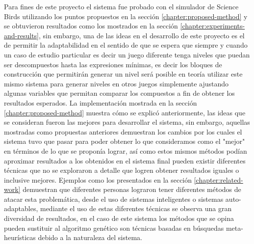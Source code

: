 Para fines de este proyecto el sistema fue probado con el simulador de Science
Birds utilizando los puntos propuestos en la sección
\ref{chapter:proposed-method} y se obtuvieron resultados como los mostrados en
la sección \ref{chapter:experiments-and-results}, sin embargo, una de las ideas
en el desarrollo de este proyecto es el de permitir la adaptabilidad
 en el
sentido de que se espera que siempre y cuando un caso de estudio particular es
decir un juego diferente tenga niveles que puedan ser descompuestos hasta las
expresiones mínimas, es decir los bloques de construcción que permitirán generar
un nivel será posible en teoría utilizar este mismo sistema para generar niveles
en otros juegos simplemente ajustando algunas variables que permitan comparar
los compuestos a fin de obtener los resultados esperados.
La implementación mostrada en la sección \ref{chapter:proposed-method} muestra
cómo se explicó anteriormente, las ideas que se consideran fueron las mejores
para desarrollar el sistema, sin embargo, aquellas mostradas como propuestas
anteriores demuestran los cambios por los cuales el sistema tuvo que pasar para
poder obtener lo que consideramos como el "mejor" en términos de lo que se
proponía lograr, así como estos mismos métodos podían aproximar resultados a los
obtenidos en el sistema final pueden existir diferentes técnicas que no se
exploraron a detalle que logren obtener resultados iguales o inclusive mejores.
Ejemplos como los presentados en la sección \ref{chapter:related-work}
demuestran que diferentes personas lograron tener diferentes métodos de atacar
esta problemática, desde el uso de sistemas inteligentes o sistemas
auto-adaptables, mediante el uso de estas diferentes técnicas se observa una
gran diversidad de resultados, en el caso de este sistema los métodos que se
opina pueden sustituir al algoritmo genético son técnicas basadas en búsquedas
meta-heurísticas debido a la naturaleza del sistema.

